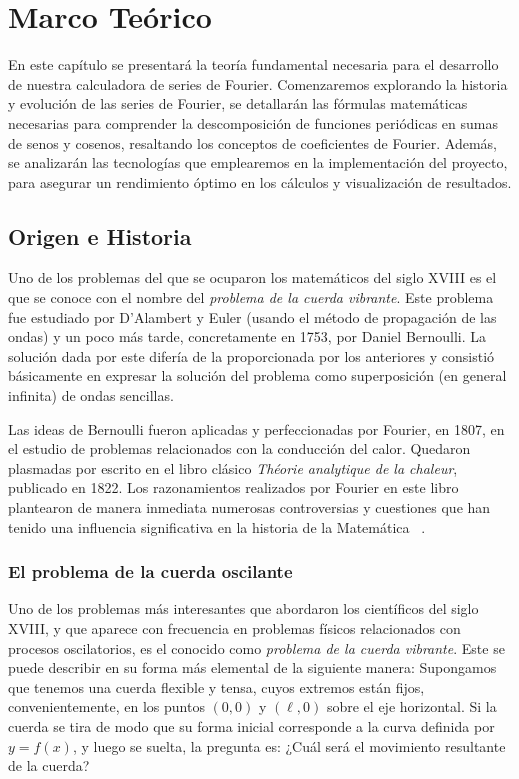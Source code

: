 \chapter{Marco Teórico}\label{ch:Marco Teórico}
En este capítulo se presentará la teoría fundamental necesaria para el desarrollo de nuestra calculadora de series de Fourier. Comenzaremos explorando la historia y evolución de las series de Fourier, se detallarán las fórmulas matemáticas necesarias para comprender la descomposición de funciones periódicas en sumas de senos y cosenos, resaltando los conceptos de coeficientes de Fourier. Además, se analizarán las tecnologías que emplearemos en la implementación del proyecto, para asegurar un rendimiento óptimo en los cálculos y visualización de resultados.

\section{Origen e Historia}
Uno de los problemas del que se ocuparon los matemáticos del siglo XVIII es el que se conoce con el nombre del \textit{problema de la cuerda vibrante}. Este problema fue estudiado por D’Alambert y Euler (usando el método de propagación de las ondas) y un poco más tarde, concretamente en 1753, por Daniel Bernoulli. La solución dada por este difería de la proporcionada por los anteriores y consistió básicamente en expresar la solución del problema como superposición (en general infinita) de ondas sencillas. 

Las ideas de Bernoulli fueron aplicadas y perfeccionadas por Fourier, en 1807, en el estudio de problemas relacionados con la conducción del calor. Quedaron plasmadas por escrito en el libro clásico \emph{Théorie analytique de la chaleur}, publicado en 1822. Los razonamientos realizados por Fourier en este libro plantearon de manera inmediata numerosas controversias y cuestiones que han tenido una influencia significativa en la historia de la Matemática ~\cite{historia-alambert-fourier-euler}.

\subsection{El problema de la cuerda oscilante}

Uno de los problemas más interesantes que abordaron los científicos del siglo XVIII, y que aparece con frecuencia en problemas físicos relacionados con procesos oscilatorios, es el conocido como \textit{problema de la cuerda vibrante}. Este se puede describir en su forma más elemental de la siguiente manera: Supongamos que tenemos una cuerda flexible y tensa, cuyos extremos están fijos, convenientemente, en los puntos $(0, 0)$ y $(\ell, 0)$ sobre el eje horizontal. Si la cuerda se tira de modo que su forma inicial corresponde a la curva definida por $y = f(x)$, y luego se suelta, la pregunta es: ¿Cuál será el movimiento resultante de la cuerda?

